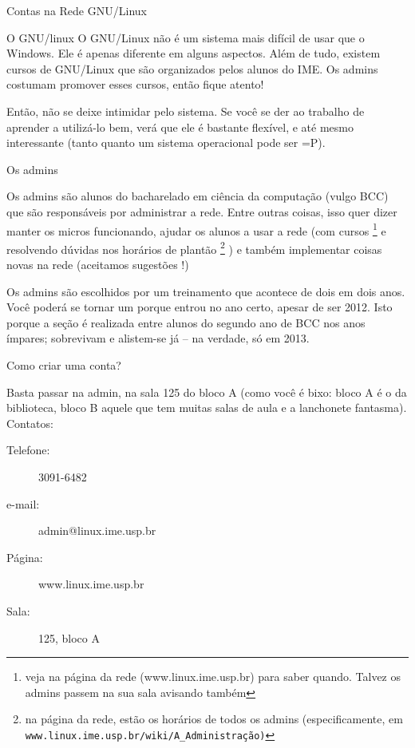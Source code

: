 \begin{secao}{Contas na Rede GNU/Linux}
\begin{subsecao}{O GNU/linux }
O GNU/Linux não é um sistema mais difícil de usar que o Windows. Ele é apenas diferente em alguns aspectos. Além de tudo, existem cursos de GNU/Linux que são organizados pelos alunos do IME. Os admins costumam promover esses cursos, então fique atento!

Então, não se deixe intimidar pelo sistema. Se você se der ao trabalho de aprender a utilizá-lo bem, verá que ele é bastante flexível, e até mesmo interessante (tanto quanto um sistema operacional pode ser =P).


\end{subsecao}

\begin{subsecao}{Os admins}

Os admins são alunos do bacharelado em ciência da computação (vulgo BCC) que são responsáveis por administrar a rede. Entre outras coisas, isso quer dizer manter os micros funcionando, ajudar os alunos a usar a rede (com cursos \footnote{ veja na página da rede (www.linux.ime.usp.br) para saber quando. Talvez os admins passem na sua sala avisando também} e resolvendo dúvidas nos horários de plantão \footnote{na página da rede, estão os horários de todos os admins (especificamente, em {\tt www.linux.ime.usp.br/wiki/A\_Administração)}}
) e também implementar coisas novas na 
rede (aceitamos sugestões !)

Os admins são escolhidos por um treinamento que acontece de dois em dois anos. Você poderá se tornar um porque entrou no ano certo, apesar de ser 2012. Isto porque a seção é realizada entre alunos do segundo ano de BCC nos anos ímpares; sobrevivam e alistem-se já – na verdade, só em 2013. 

\end{subsecao}
\begin{subsecao}{Como criar uma conta?}

Basta passar na admin, na sala 125 do bloco A (como você é bixo: bloco A é o da biblioteca, bloco B aquele que tem muitas salas de aula e a lanchonete fantasma). Contatos:
\begin{description}

\item [Telefone:] 3091-6482
\item [e-mail:] admin@linux.ime.usp.br
\item [Página:] www.linux.ime.usp.br
\item [Sala:] 125, bloco A

\end{description}
\end{subsecao}
\end{secao}
